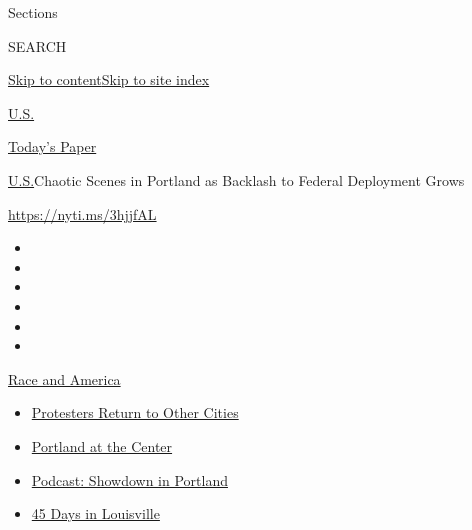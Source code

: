 Sections

SEARCH

\protect\hyperlink{site-content}{Skip to
content}\protect\hyperlink{site-index}{Skip to site index}

\href{https://www.nytimes3xbfgragh.onion/section/us}{U.S.}

\href{https://myaccount.nytimes3xbfgragh.onion/auth/login?response_type=cookie\&client_id=vi}{}

\href{https://www.nytimes3xbfgragh.onion/section/todayspaper}{Today's
Paper}

\href{/section/us}{U.S.}\textbar{}Chaotic Scenes in Portland as Backlash
to Federal Deployment Grows

\url{https://nyti.ms/3hjjfAL}

\begin{itemize}
\item
\item
\item
\item
\item
\item
\end{itemize}

\href{https://www.nytimes3xbfgragh.onion/news-event/george-floyd-protests-minneapolis-new-york-los-angeles?action=click\&pgtype=Article\&state=default\&region=TOP_BANNER\&context=storylines_menu}{Race
and America}

\begin{itemize}
\tightlist
\item
  \href{https://www.nytimes3xbfgragh.onion/2020/07/26/us/protests-portland-seattle-trump.html?action=click\&pgtype=Article\&state=default\&region=TOP_BANNER\&context=storylines_menu}{Protesters
  Return to Other Cities}
\item
  \href{https://www.nytimes3xbfgragh.onion/2020/07/24/us/portland-oregon-protests-white-race.html?action=click\&pgtype=Article\&state=default\&region=TOP_BANNER\&context=storylines_menu}{Portland
  at the Center}
\item
  \href{https://www.nytimes3xbfgragh.onion/2020/07/23/podcasts/the-daily/portland-protests.html?action=click\&pgtype=Article\&state=default\&region=TOP_BANNER\&context=storylines_menu}{Podcast:
  Showdown in Portland}
\item
  \href{https://www.nytimes3xbfgragh.onion/interactive/2020/07/16/us/black-lives-matter-protests-louisville-breonna-taylor.html?action=click\&pgtype=Article\&state=default\&region=TOP_BANNER\&context=storylines_menu}{45
  Days in Louisville}
\end{itemize}

